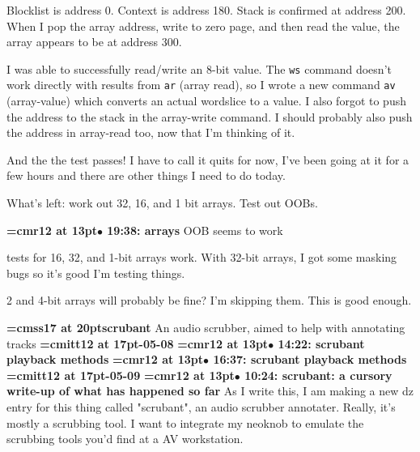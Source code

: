 Blocklist is address 0. Context is address 180. Stack is confirmed at address 200. When I pop the array address,  write to zero page, and then read the value, the array appears to be at address 300.
\par

I was able to successfully read/write an 8-bit value. The {\tt ws} command doesn't work directly with results from {\tt ar} (array read), so I wrote a new command {\tt av} (array-value) which converts an actual wordslice to a value. I also forgot to push the address to the stack in the array-write command. I should probably also push the address in array-read too, now that I'm thinking of it.
\par

And the the test passes! I have to call it quits for now, I've been going at it for a few hours and there are other things I need to do today.
\par

What's left: work out 32, 16, and 1 bit arrays. Test out OOBs.
\par

{\smallskip\noindent\bf\font\titlefont=cmr12 at 13pt\titlefont $\bullet$ 19:38: arrays}\smallskip
OOB seems to work
\par

tests for 16, 32, and 1-bit arrays work. With 32-bit arrays, I got some masking bugs so it's good I'm testing things.
\par

2 and 4-bit arrays will probably be fine? I'm skipping them. This is good enough.
\par

{\medskip\noindent\bf\font\titlefont=cmss17 at 20pt\titlefont scrubant}\medskip
An audio scrubber, aimed to help with annotating tracks
{\medskip\noindent\bf\font\titlefont=cmitt12 at 17pt-05-08}\medskip
{\smallskip\noindent\bf\font\titlefont=cmr12 at 13pt\titlefont $\bullet$ 14:22: scrubant playback methods}\smallskip
{\smallskip\noindent\bf\font\titlefont=cmr12 at 13pt\titlefont $\bullet$ 16:37: scrubant playback methods}\smallskip
{\medskip\noindent\bf\font\titlefont=cmitt12 at 17pt-05-09}\medskip
{\smallskip\noindent\bf\font\titlefont=cmr12 at 13pt\titlefont $\bullet$ 10:24: scrubant: a cursory write-up of what has happened so far}\smallskip
As I write this, I am making a new dz entry for this thing called "scrubant", an audio scrubber annotater. Really, it's mostly a scrubbing tool. I want to integrate my neoknob to emulate the scrubbing tools you'd find at a AV workstation.
\par

